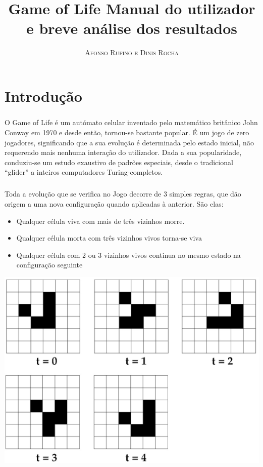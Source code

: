 \documentclass[a4paper,11pt]{book}
\title{\Huge \textbf{Game of Life}  \huge Manual do utilizador e breve análise dos resultados}
\author{\textsc{Afonso Rufino e Dinis Rocha}}
\begin{document}
\frontmatter
\maketitle

\tableofcontents

\mainmatter

\chapter{Introdução}
\paragraph{}
O Game of Life é um autómato celular inventado pelo matemático britânico John Conway em 1970 e desde então, tornou-se bastante popular. É um jogo de zero jogadores, significando que a sua evolução é determinada pelo estado inicial, não requerendo mais nenhuma interação do utilizador. Dada a sua popularidade, conduziu-se um estudo exaustivo de padrões especiais, desde o tradicional “glider” a inteiros computadores Turing-completos.
\paragraph{} Toda a evolução que se verifica no Jogo decorre de 3 simples regras, que dão origem a uma nova configuração quando aplicadas à anterior. São elas:

\begin{itemize}
\item Qualquer célula viva com mais de três vizinhos morre.
\item Qualquer célula morta com três vizinhos vivos torna-se viva
\item Qualquer célula com 2 ou 3 vizinhos vivos continua no mesmo estado na configuração seguinte
\end{itemize}
\includegraphics[scale = 0.2]{glider}
\end{document}
